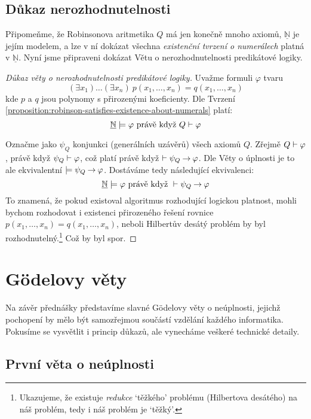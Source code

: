 \subsection{Důkaz nerozhodnutelnosti}

Připomeňme, že Robinsonova aritmetika $Q$ má jen konečně mnoho axiomů, $\underline{\mathbb N}$ je jejím modelem, a lze v ní dokázat všechna \emph{existenční tvrzení o numerálech} platná v $\underline{\mathbb N}$. Nyní jsme připraveni dokázat Větu o nerozhodnutelnosti predikátové logiky.

\begin{proof}[Důkaz věty o nerozhodnutelnosti predikátové logiky]
Uvažme formuli $\varphi$ tvaru 
$$(\exists x_1)\dots(\exists x_n)\ p(x_1,\dots,x_n)=q(x_1,\dots,x_n)
$$ 
kde $p$ a $q$ jsou polynomy s přirozenými koeficienty. Dle Tvrzení \ref{proposition:robinson-satisfies-existence-about-numerals} platí:
$$
\underline{\mathbb N}\models \varphi\text{ právě když }Q\vdash \varphi
$$

Označme jako $\psi_Q$ konjunkci (generálních uzávěrů) všech axiomů $Q$. Zřejmě $Q\vdash\varphi$, právě když $\psi_Q\vdash\varphi$, což platí právě když $\vdash\psi_Q\mathbin{\rightarrow}\varphi$. Dle Věty o úplnosti je to ale ekvivalentní $\models\psi_Q\mathbin{\rightarrow}\varphi$. Dostáváme tedy následující ekvivalenci:
$$
\underline{\mathbb N}\models \varphi\text{ právě když }\vdash \psi_Q\mathbin{\rightarrow}\varphi
$$
To znamená, že pokud existoval algoritmus rozhodující logickou platnost, mohli bychom rozhodovat i existenci přirozeného řešení rovnice $p(x_1,\dots,x_n)=q(x_1,\dots,x_n)$, neboli Hilbertův desátý problém by byl rozhodnutelný.\footnote{Ukazujeme, že existuje \emph{redukce} `těžkého' problému (Hilbertova desátého) na náš problém, tedy i náš problém je `těžký'.} Což by byl spor.   
\end{proof}

\section{Gödelovy věty}

Na závěr přednášky představíme slavné Gödelovy věty o neúplnosti, jejichž pochopení by mělo být samozřejmou součástí vzdělání každého informatika. Pokusíme se vysvětlit i princip důkazů, ale vynecháme veškeré technické detaily.

\subsection{První věta o neúplnosti}

